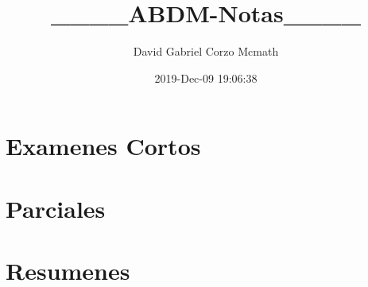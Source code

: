 \documentclass{book}
\title{____ABDM-Notas____}
\author{David Gabriel Corzo Mcmath}
\date{2019-Dec-09 19:06:38}
\begin{document}
\part{ Examenes Cortos }












\part{ Parciales }


\part{ Resumenes }












\end{document}
